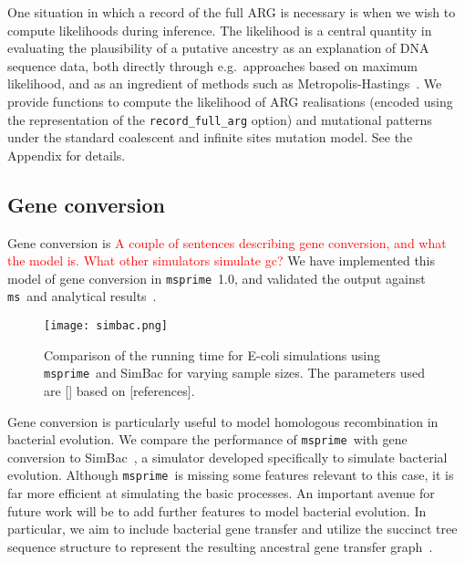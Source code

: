 \documentclass{article}
\newcommand{\msprime}[0]{\texttt{msprime}}
\newcommand{\ms}[0]{\texttt{ms}}
\newcommand{\jkcomment}[1]{\textcolor{red}{#1}}
\begin{document}
One situation in which a record of the full ARG is necessary is when we
wish to compute likelihoods during inference.
The likelihood is a central quantity in evaluating the plausibility of a putative
ancestry as an explanation of DNA sequence data, both directly through
e.g.~approaches based on maximum likelihood, and as an ingredient of
methods such as
Metropolis-Hastings~\citep{kuhner2000maximum,nielsen2000estimation,wang2008bayesian}.
We provide functions to compute the likelihood of ARG realisations
(encoded using the representation of the \texttt{record\_full\_arg} option)
and mutational patterns under
the standard coalescent and infinite sites mutation model.
See the Appendix for details.

\subsection*{Gene conversion}

Gene conversion is \jkcomment{A couple of sentences describing gene
conversion, and what the model is. What other simulators simulate
gc? }
We have implemented this model of gene
conversion in \msprime\ 1.0, and validated the output against
\ms\ and analytical results~\citep{wiuf2000coalescent}.

\begin{figure}
\begin{center}
\texttt{[image: simbac.png]}
\end{center}
\caption{\label{fig-gc-perf}Comparison of the running time
for E-coli simulations using \msprime\ and SimBac for varying
sample sizes. The parameters used are [] based on [references].}
\end{figure}

Gene conversion is particularly useful to model homologous recombination in
bacterial evolution.
We compare the performance of \msprime\ with gene conversion to
SimBac~\citep{brown2016simbac}, a simulator developed specifically to
simulate bacterial evolution. Although \msprime\ is missing some features
relevant to this case, it is far more efficient at simulating the basic
processes. An important avenue for future work
will be to add further features to model bacterial
evolution. In particular, we aim to include bacterial gene transfer and utilize
the succinct tree sequence structure to represent the resulting ancestral gene
transfer graph~\citep{baumdicker2014AGTG}.
\end{document}
